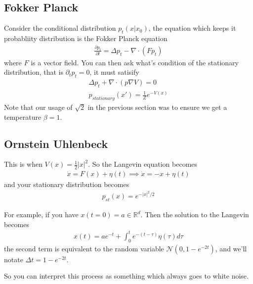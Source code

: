 \subsection{Fokker Planck}
Consider the conditional distribution $p_t(x | x_0)$, the equation which keeps it probabliity distribution is the Fokker Planck equation
\begin{align}
	\frac{\partial p_t}{\partial t} = \Delta p_t - \nabla \cdot  (F p_t)
\end{align} 
where $F$ is a vector field. You can then ask what's condition of the stationary distribution, that is $\partial_t p_t = 0$, it must satisify
\begin{align}
	\Delta p_t + \nabla \cdot (p \nabla V) = 0\\
	p_{stationary}(x') = \frac{1}{Z} e^{-V(x)}
\end{align}
Note that our usage of $\sqrt{2}$ in the previous section was to ensure we get a temperature $\beta = 1$.

\subsection{Ornstein Uhlenbeck}
This is when $V(x) = \frac{1}{2} |x|^2$. So the Langevin equation becomes
\begin{align}
	\dot x = F(x) + \eta(t) \implies \dot x = - x + \eta(t)
\end{align}
and your stationary distribution becomes
\begin{align}
	p_{st}(x) = e^{-|x|^2 / 2}
\end{align}
\begin{sidework}
	For example, if you have $x(t=0) = a \in \mathbb R^d$. Then the solution to the Langevin becomes
	\begin{align}
		x(t) = a e^{-t} + \int_0^t e^{-(t-\tau)}\eta(\tau) d\tau
	\end{align}
	the second term is equivalent to the random variable $\mathcal N(0, 1-e^{-2t})$, and we'll notate $\Delta t = 1-e^{-2t}$.
\end{sidework}
So you can interpret this process as something which always goes to white noise.
